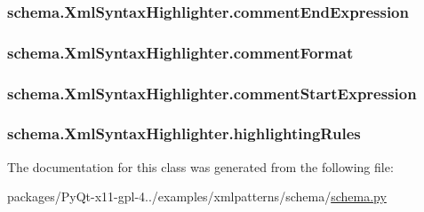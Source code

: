 \subsubsection[{comment\+End\+Expression}]{\setlength{\rightskip}{0pt plus 5cm}schema.\+Xml\+Syntax\+Highlighter.\+comment\+End\+Expression}\label{classschema_1_1XmlSyntaxHighlighter_aff3e59549326b1a49ce9649cb40670c8}
\hypertarget{classschema_1_1XmlSyntaxHighlighter_ac10572f683bdd77e11df6b452c390982}{}
\subsubsection[{comment\+Format}]{\setlength{\rightskip}{0pt plus 5cm}schema.\+Xml\+Syntax\+Highlighter.\+comment\+Format}\label{classschema_1_1XmlSyntaxHighlighter_ac10572f683bdd77e11df6b452c390982}
\hypertarget{classschema_1_1XmlSyntaxHighlighter_a5905e85529138adaeca0f4af468ccacd}{}
\subsubsection[{comment\+Start\+Expression}]{\setlength{\rightskip}{0pt plus 5cm}schema.\+Xml\+Syntax\+Highlighter.\+comment\+Start\+Expression}\label{classschema_1_1XmlSyntaxHighlighter_a5905e85529138adaeca0f4af468ccacd}
\hypertarget{classschema_1_1XmlSyntaxHighlighter_a58fd14a34f42c53d3d720ebe7edc6f61}{}
\subsubsection[{highlighting\+Rules}]{\setlength{\rightskip}{0pt plus 5cm}schema.\+Xml\+Syntax\+Highlighter.\+highlighting\+Rules}\label{classschema_1_1XmlSyntaxHighlighter_a58fd14a34f42c53d3d720ebe7edc6f61}


The documentation for this class was generated from the following file\+:\begin{DoxyCompactItemize}
\item 
packages/\+Py\+Qt-\/x11-\/gpl-\/4../examples/xmlpatterns/schema/\hyperlink{schema_8py}{schema.\+py}\end{DoxyCompactItemize}
